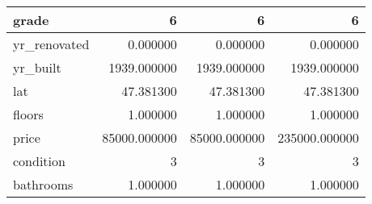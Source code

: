 \begin{table}[H]
\begin{tabular}{|l|r|r|r|}
\hline grade & \cellcolor[rgb]{0.9, 0.54, 0.52} 6 & \cellcolor[rgb]{0.9, 0.54, 0.52} 6 & \cellcolor[rgb]{0.9, 0.54, 0.52} 6 \\
\hline yr\_renovated & \cellcolor[rgb]{0.9, 0.54, 0.52} 0.000000 & \cellcolor[rgb]{0.9, 0.54, 0.52} 0.000000 & \cellcolor[rgb]{0.9, 0.54, 0.52} 0.000000 \\
\hline yr\_built & \cellcolor[rgb]{0.9, 0.54, 0.52} 1939.000000 & \cellcolor[rgb]{0.9, 0.54, 0.52} 1939.000000 & \cellcolor[rgb]{0.9, 0.54, 0.52} 1939.000000 \\
\hline lat & \cellcolor[rgb]{0.9, 0.54, 0.52} 47.381300 & \cellcolor[rgb]{0.9, 0.54, 0.52} 47.381300 & \cellcolor[rgb]{0.9, 0.54, 0.52} 47.381300 \\
\hline floors & \cellcolor[rgb]{0.9, 0.54, 0.52} 1.000000 & \cellcolor[rgb]{0.9, 0.54, 0.52} 1.000000 & \cellcolor[rgb]{0.9, 0.54, 0.52} 1.000000 \\
\hline price & \cellcolor[rgb]{0.9, 0.54, 0.52} 85000.000000 & \cellcolor[rgb]{0.9, 0.54, 0.52} 85000.000000 & 235000.000000 \\
\hline condition & \cellcolor[rgb]{0.9, 0.54, 0.52} 3 & \cellcolor[rgb]{0.9, 0.54, 0.52} 3 & \cellcolor[rgb]{0.9, 0.54, 0.52} 3 \\
\hline bathrooms & \cellcolor[rgb]{0.9, 0.54, 0.52} 1.000000 & \cellcolor[rgb]{0.9, 0.54, 0.52} 1.000000 & \cellcolor[rgb]{0.9, 0.54, 0.52} 1.000000 \\
\hline
\end{tabular}
\end{table}
